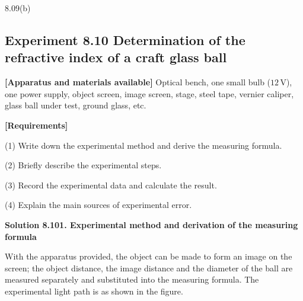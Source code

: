 \begin{figbox}{8.09(b)}
\end{figbox}

\subsection*{Experiment 8.10 \quad Determination of the refractive index of a craft glass ball}

\textbf{[Apparatus and materials available]} Optical bench, one small bulb ($12\,\mathrm{V}$), one power supply, object screen, image screen, stage, steel tape, vernier caliper, glass ball under test, ground glass, etc.

\textbf{[Requirements]}

(1) Write down the experimental method and derive the measuring formula.

(2) Briefly describe the experimental steps.

(3) Record the experimental data and calculate the result.

(4) Explain the main sources of experimental error.

\textbf{Solution 8.10}\quad \textbf{1. Experimental method and derivation of the measuring formula}

With the apparatus provided, the object can be made to form an image on the screen; the object distance, the image distance and the diameter of the ball are measured separately and substituted into the measuring formula. The experimental light path is as shown in the figure.

